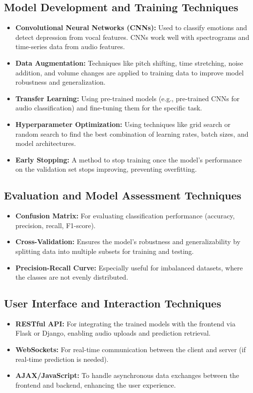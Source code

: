 \subsection{Model Development and Training Techniques}
\begin{itemize}
    \item \textbf{Convolutional Neural Networks (CNNs):} Used to classify emotions and detect depression from vocal features. CNNs work well with spectrograms and time-series data from audio features.
    \item \textbf{Data Augmentation:} Techniques like pitch shifting, time stretching, noise addition, and volume changes are applied to training data to improve model robustness and generalization.
    \item \textbf{Transfer Learning:} Using pre-trained models (e.g., pre-trained CNNs for audio classification) and fine-tuning them for the specific task.
    \item \textbf{Hyperparameter Optimization:} Using techniques like grid search or random search to find the best combination of learning rates, batch sizes, and model architectures.
    \item \textbf{Early Stopping:} A method to stop training once the model's performance on the validation set stops improving, preventing overfitting.
\end{itemize}

\subsection{Evaluation and Model Assessment Techniques}
\begin{itemize}
    \item \textbf{Confusion Matrix:} For evaluating classification performance (accuracy, precision, recall, F1-score).
    \item \textbf{Cross-Validation:} Ensures the model's robustness and generalizability by splitting data into multiple subsets for training and testing.
    \item \textbf{Precision-Recall Curve:} Especially useful for imbalanced datasets, where the classes are not evenly distributed.
\end{itemize}

\subsection{User Interface and Interaction Techniques}
\begin{itemize}
    \item \textbf{RESTful API:} For integrating the trained models with the frontend via Flask or Django, enabling audio uploads and prediction retrieval.
    \item \textbf{WebSockets:} For real-time communication between the client and server (if real-time prediction is needed).
    \item \textbf{AJAX/JavaScript:} To handle asynchronous data exchanges between the frontend and backend, enhancing the user experience.
\end{itemize}
